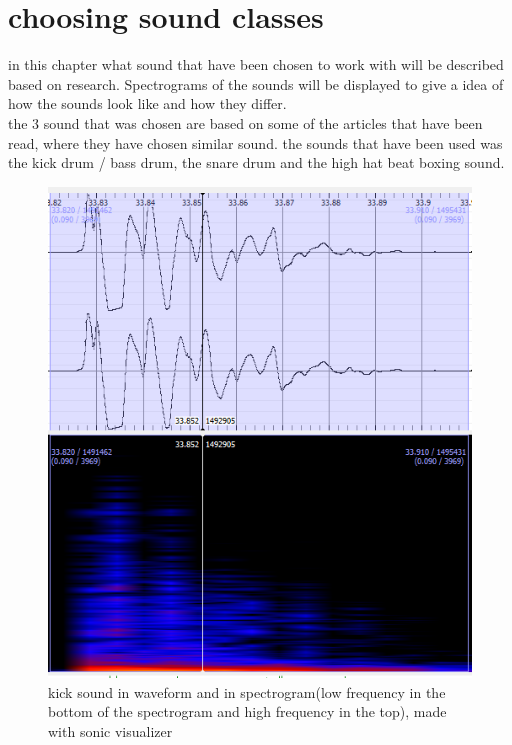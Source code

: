 \section{choosing sound classes}
in this chapter what sound that have been chosen to work with will be described based on research. Spectrograms of the sounds will be displayed to give a idea of how the sounds look like and how they differ.\\
the 3 sound that was chosen are based on some of the articles that have been read, where they have chosen similar sound\citep{Stowell2010}\citep{QBBB}. the sounds that have been used was the kick drum / bass drum, the snare drum and the high hat beat boxing sound.\\
\begin{figure}[h]
	\begin{center}
		\includegraphics[scale = 0.4]{fig/Kick-closeup-with-spectrogram.png}
		\caption{kick sound in waveform and in spectrogram(low frequency in the bottom of the spectrogram and high frequency in the top), made with sonic visualizer}
		\label{KickCloseup}
	\end{center}
\end{figure} 
